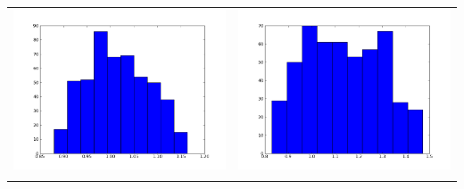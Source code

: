 \documentclass[12pt,a4paper,titlepage]{article}
\begin{document}
\begin{table}[ht]
\begin{tabular}{cc}
\includegraphics[scale=0.2]{p4th1_4}&\includegraphics[scale=0.2]{p4th2_4.png}\\
\newline

\end{tabular}
\end{table}
\end{document}
